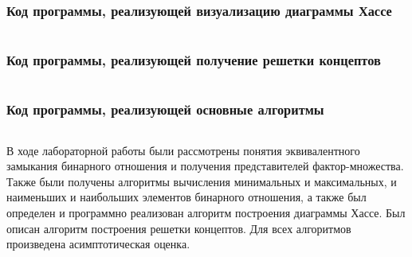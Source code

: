 \documentclass[bachelor, och, labwork]{shiza}
\begin{document}
        \subsubsection{Код программы, реализующей визуализацию диаграммы Хассе}
            \inputminted{python}{code/hassevisualization.py}
        \subsubsection{Код программы, реализующей получение решетки концептов}
            \inputminted{python}{code/latticeofconcepts.py}
        \subsubsection{Код программы, реализующей основные алгоритмы}
            \inputminted{python}{code/lab2.py}
      


\conclusion
В ходе лабораторной работы были рассмотрены понятия эквивалентного замыкания
бинарного отношения и получения представителей фактор-множества. Также были
получены алгоритмы вычисления минимальных и максимальных, и наименьших и наибольших
элементов бинарного отношения, а также был определен и программно реализован
алгоритм построения диаграммы Хассе. Был описан алгоритм построения решетки
концептов. Для всех алгоритмов произведена асимптотическая оценка.
\end{document}
